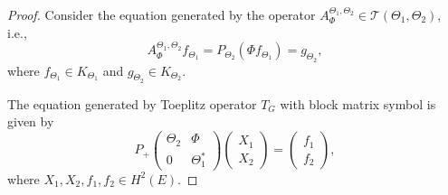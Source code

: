 \documentclass{amsart}
\theoremstyle{definition}
\begin{document}
\begin{proof}
Consider the equation generated by the operator $A_{\Phi}^{\Theta_{1},\Theta_{2}}\in \mathcal{T}(\Theta_{1},\Theta_{2})$, i.e.,
\begin{equation}\label{asymm}
A_{\Phi}^{\Theta_{1},\Theta_{2}}f_{\Theta_{1}}=P_{\Theta_{2}}(\Phi f_{\Theta_{1}})=g_{\Theta_{2}},
\end{equation}
where $f_{\Theta_{1}}\in K_{\Theta_{1}}$ and $g_{\Theta_{2}}\in K_{\Theta_{2}}$.
\medskip

The equation generated by Toeplitz operator $T_{G}$ with block matrix symbol is given by
 \begin{equation}\label{TG}
P_{+}\begin{pmatrix}
\Theta_{2}& \Phi\\
0&\Theta_{1}^{*}
\end{pmatrix}
\begin{pmatrix}
X_{1}\\
X_{2}
\end{pmatrix}
=\begin{pmatrix}
f_{1}\\
f_{2}
\end{pmatrix},
\end{equation}
where $X_{1}, X_{2}, f_{1}, f_{2}\in H^{2}(E)$.


\end{proof}
\end{document}
